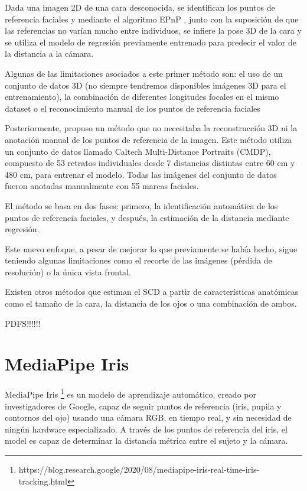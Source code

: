 Dada una imagen 2D de una cara desconocida, se identifican los puntos de referencia faciales y mediante el algoritmo EPnP \cite{29}, junto con la suposición de que las referencias no varían mucho entre individuos, se infiere la pose 3D de la cara y se utiliza el modelo de regresión previamente entrenado para predecir el valor de la distancia a la cámara.

Algunas de las limitaciones asociados a este primer método son: el uso de un conjunto de datos 3D (no siempre tendremos disponibles imágenes 3D para el entrenamiento), la combinación de diferentes longitudes focales en el mismo dataset o el reconocimiento manual de los puntos de referencia faciales

Posteriormente, \cite{30} propuso un método que no necesitaba la reconstrucción 3D ni la anotación manual de los puntos de referencia de la imagen. Este método utiliza un conjunto de datos llamado Caltech Multi-Distance Portraits (CMDP), compuesto de 53 retratos individuales desde 7 distancias distintas entre 60 cm y 480 cm, para entrenar el modelo. Todas las imágenes del conjunto de datos fueron anotadas manualmente con 55 marcas faciales. 

El método se basa en dos fases: primero, la identificación automática de los puntos de referencia faciales, y después, la estimación de la distancia mediante regresión.

Este nuevo enfoque, a pesar de mejorar lo que previamente se había hecho, sigue teniendo algunas limitaciones como el recorte de las imágenes (pérdida de resolución) o la única vista frontal.

Existen otros métodos que estiman el SCD a partir de características anatómicas como el tamaño de la cara, la distancia de los ojos o una combinación de ambos.

PDFS!!!!!!

\section{MediaPipe Iris}

MediaPipe Iris \footnote{https://blog.research.google/2020/08/mediapipe-iris-real-time-iris-tracking.html} es un modelo de aprendizaje automático, creado por investigadores de Google, capaz de seguir puntos de referencia (iris, pupila y contornos del ojo) usando una cámara RGB, en tiempo real, y sin necesidad de ningún hardware especializado. A través de los puntos de referencia del iris, el model es capaz de determinar la distancia métrica entre el sujeto y la cámara.


